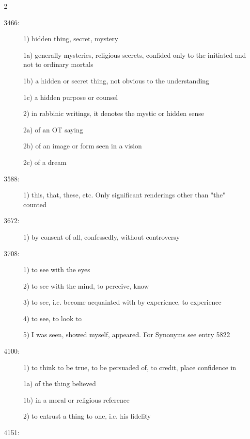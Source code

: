 \documentclass[letterpaper]{article}
\begin{document}
\begin{multicols}{2}
\begin{description}
\item[3466: ]



1) hidden thing, secret, mystery

1a) generally mysteries, religious secrets, confided only to the
initiated and not to ordinary mortals

1b) a hidden or secret thing, not obvious to the understanding

1c) a hidden purpose or counsel

2) in rabbinic writings, it denotes the mystic or hidden sense

2a) of an OT saying

2b) of an image or form seen in a vision

2c) of a dream



\item[3588: ]



1) this, that, these, etc.
Only significant renderings other than "the" counted



\item[3672: ]



1) by consent of all, confessedly, without controversy



\item[3708: ]



1) to see with the eyes

2) to see with the mind, to perceive, know

3) to see, i.e. become acquainted with by experience, to experience

4) to see, to look to

5) I was seen, showed myself, appeared.
For Synonyms see entry 5822



\item[4100: ]



1) to think to be true, to be persuaded of, to credit, place
confidence in

1a) of the thing believed

1b) in a moral or religious reference

2) to entrust a thing to one, i.e. his fidelity


\item[4151: ]




\end{description}
\end{multicols}
\end{document}
